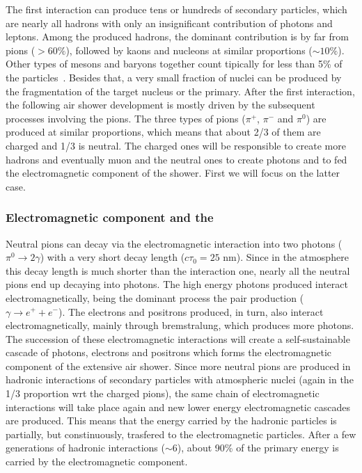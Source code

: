 The first interaction can produce tens or hundreds of
secondary particles, which are nearly all hadrons
with only an insignificant contribution of photons and leptons.
Among the produced hadrons, the dominant contribution is by far from pions ($>60\%$),
followed by kaons and nucleons at similar proportions ($\sim 10\%$). Other
types of mesons and baryons together count tipically for less than 5\% of
the particles~\cite{Calcagni:2017tws}.
Besides that, a very small fraction of nuclei can be produced
by the fragmentation of the target nucleus or the primary.
After the first interaction, the following air shower development is mostly driven
by the subsequent processes involving the pions. The three types of pions ($\pi^+$, $\pi^-$ and $\pi^0$)
are produced at similar proportions, which means that about 2/3 of them are charged and
1/3 is neutral. The charged ones will be responsible to create more
hadrons and eventually muon and the neutral ones to create photons and
to fed the electromagnetic component of the shower.
First we will focus on the latter case.

\subsubsection[Electromagnetic component and the \xmax]{\boldmath Electromagnetic component and the \xmax}
\label{sec:showers:phen:em}


Neutral pions can decay via the electromagnetic interaction into two photons ($\pi^0\rightarrow 2\gamma$)
with a very short decay length ($c\tau_0=25$ nm). Since in the atmosphere this decay length
is much shorter than the interaction one, nearly all the neutral pions end up decaying into
photons. The high energy photons produced interact electromagnetically, being the dominant
process the pair production ($\gamma\rightarrow e^++e^-$). The electrons and positrons
produced, in turn, also interact electromagnetically, mainly through bremstralung, which
produces more photons. The succession of these electromagnetic interactions
will create a self-sustainable cascade of photons, electrons and positrons
which forms the electromagnetic component of the extensive air shower.
Since more neutral pions are produced in hadronic interactions of secondary
particles with atmospheric nuclei (again in the 1/3 proportion wrt the charged pions),
the same chain of electromagnetic interactions will take place again
and new lower energy electromagnetic cascades are produced.
This means that the energy carried by the hadronic particles
is partially, but constinuously, trasfered to the electromagnetic particles.
After a few generations of hadronic interactions ($\sim 6$), about 90\% of
the primary energy is carried by the electromagnetic component.


